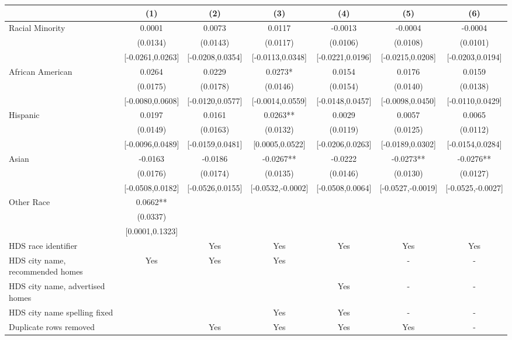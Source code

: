\begin{table}[htbp]
{\begin{tabular}{l*{6}{c}}
                    \cmidrule(lr){2-2}\cmidrule(lr){3-3}\cmidrule(lr){4-4}\cmidrule(lr){5-5}\cmidrule(lr){6-6}\cmidrule(lr){7-7}
                    &\multicolumn{1}{c}{(1)}   &\multicolumn{1}{c}{(2)}   &\multicolumn{1}{c}{(3)}   &\multicolumn{1}{c}{(4)}   &\multicolumn{1}{c}{(5)}   &\multicolumn{1}{c}{(6)}\\
\midrule
Racial Minority & 0.0001 & 0.0073 & 0.0117 & -0.0013 & -0.0004 & -0.0004 \\
 & (0.0134) & (0.0143) & (0.0117) & (0.0106) & (0.0108) & (0.0101) \\
 & [-0.0261,0.0263] & [-0.0208,0.0354] & [-0.0113,0.0348] & [-0.0221,0.0196] & [-0.0215,0.0208] & [-0.0203,0.0194] \\
\midrule
African American & 0.0264 & 0.0229 & 0.0273* & 0.0154 & 0.0176 & 0.0159 \\
 & (0.0175) & (0.0178) & (0.0146) & (0.0154) & (0.0140) & (0.0138) \\
 & [-0.0080,0.0608] & [-0.0120,0.0577] & [-0.0014,0.0559] & [-0.0148,0.0457] & [-0.0098,0.0450] & [-0.0110,0.0429] \\
Hispanic & 0.0197 & 0.0161 & 0.0263** & 0.0029 & 0.0057 & 0.0065 \\
 & (0.0149) & (0.0163) & (0.0132) & (0.0119) & (0.0125) & (0.0112) \\
 & [-0.0096,0.0489] & [-0.0159,0.0481] & [0.0005,0.0522] & [-0.0206,0.0263] & [-0.0189,0.0302] & [-0.0154,0.0284] \\
Asian & -0.0163 & -0.0186 & -0.0267** & -0.0222 & -0.0273** & -0.0276** \\
 & (0.0176) & (0.0174) & (0.0135) & (0.0146) & (0.0130) & (0.0127) \\
 & [-0.0508,0.0182] & [-0.0526,0.0155] & [-0.0532,-0.0002] & [-0.0508,0.0064] & [-0.0527,-0.0019] & [-0.0525,-0.0027] \\
Other Race & 0.0662** &  &  &  &  &  \\
 & (0.0337) &  &  &  &  &  \\
 & [0.0001,0.1323] &  &  &  &  &  \\
\midrule
HDS race identifier & & Yes & Yes & Yes & Yes & Yes \\
HDS city name, recommended homes & Yes & Yes & Yes & & - & -\\
HDS city name, advertised homes &  &  &  & Yes & - & -\\
HDS city name spelling fixed & & & Yes & Yes & - & -\\
Duplicate rows removed &  & Yes & Yes & Yes & Yes & - \\

\end{tabular}}
\end{table}

